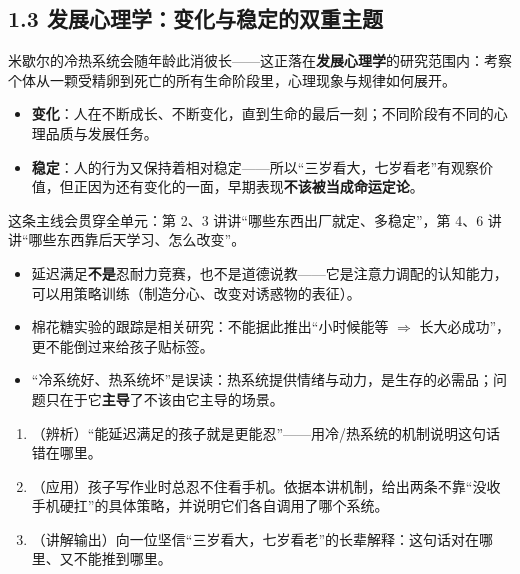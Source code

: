 \documentclass[UTF8,a4paper,11pt]{ctexart}
\begin{document}
\subsection*{1.3 发展心理学：变化与稳定的双重主题}

米歇尔的冷热系统会随年龄此消彼长——这正落在\textbf{发展心理学}的研究范围内：考察个体从一颗受精卵到死亡的所有生命阶段里，心理现象与规律如何展开。

\begin{keyconcept}[发展的两个面孔]
\begin{itemize}
  \item \textbf{变化}：人在不断成长、不断变化，直到生命的最后一刻；不同阶段有不同的心理品质与发展任务。
  \item \textbf{稳定}：人的行为又保持着相对稳定——所以“三岁看大，七岁看老”有观察价值，但正因为还有变化的一面，早期表现\textbf{不该被当成命运定论}。
\end{itemize}
\end{keyconcept}

这条主线会贯穿全单元：第 2、3 讲讲“哪些东西出厂就定、多稳定”，第 4、6 讲讲“哪些东西靠后天学习、怎么改变”。

\begin{keyconcept}[易错点与失效边界]
\begin{itemize}
  \item 延迟满足\textbf{不是}忍耐力竞赛，也不是道德说教——它是注意力调配的认知能力，可以用策略训练（制造分心、改变对诱惑物的表征）。
  \item 棉花糖实验的跟踪是相关研究：不能据此推出“小时候能等 $\Rightarrow$ 长大必成功”，更不能倒过来给孩子贴标签。
  \item “冷系统好、热系统坏”是误读：热系统提供情绪与动力，是生存的必需品；问题只在于它\textbf{主导}了不该由它主导的场景。
\end{itemize}
\end{keyconcept}

\begin{exercise}[今日自测]
\begin{enumerate}
  \item （辨析）“能延迟满足的孩子就是更能忍”——用冷/热系统的机制说明这句话错在哪里。
  \item （应用）孩子写作业时总忍不住看手机。依据本讲机制，给出两条不靠“没收手机硬扛”的具体策略，并说明它们各自调用了哪个系统。
  \item （讲解输出）向一位坚信“三岁看大，七岁看老”的长辈解释：这句话对在哪里、又不能推到哪里。
\end{enumerate}
\end{exercise}
\end{document}

